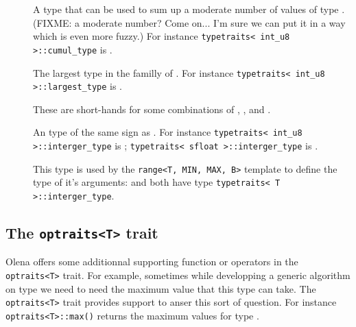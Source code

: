 \begin{description}
\item[]
A type that can be used to sum up a moderate number of values of type
.  (FIXME: a moderate number?  Come on...  I'm sure we can put
it in a way which is even more fuzzy.)
For instance
\lstinline$typetraits< int_u8 >::cumul_type$ is .

\item[]
The largest type in the familly of .  For instance
\lstinline$typetraits< int_u8 >::largest_type$ is .

\item[]
\item[]
\item[]
\item[]
These are short-hands for some combinations of ,
,  and .

\item[]
An  type of the same sign as .
For instance \lstinline$typetraits< int_u8 >::interger_type$ is ; \lstinline$typetraits< sfloat >::interger_type$ is .

This type is used by the \lstinline$range<T, MIN, MAX, B>$ template
to define the type of it's arguments:  and  both
have type \lstinline$typetraits< T >::interger_type$.

\end{description}

\subsection{The \lstinline$optraits<T>$ trait}

Olena offers some additionnal supporting function or operators in the
\lstinline$optraits<T>$ trait.  For example, sometimes while developping
a generic algorithm on type  we need to need the maximum value
that this type can take.  The \lstinline$optraits<T>$ trait provides
support to anser this sort of question.  For instance
\lstinline$optraits<T>::max()$ returns the maximum values for type
.

